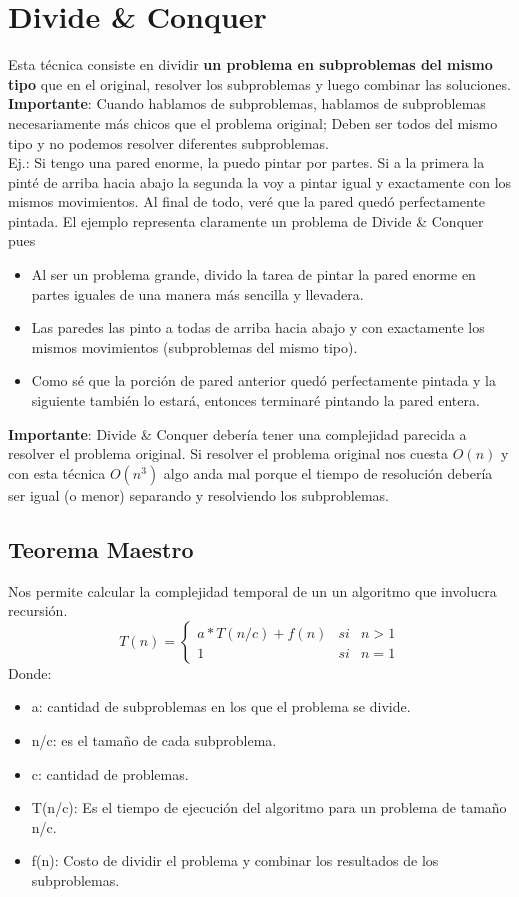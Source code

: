 \documentclass[10pt,a4paper]{article}
\begin{document}
\section*{Divide \& Conquer}
Esta técnica consiste en dividir \textbf{un problema en subproblemas
 del mismo tipo} que en el original, resolver los subproblemas y luego combinar las soluciones. \\

\textbf{Importante}: Cuando hablamos de subproblemas, hablamos de subproblemas necesariamente más chicos que el problema original; Deben ser todos del mismo tipo y no podemos resolver diferentes subproblemas. \\

Ej.: Si tengo una pared enorme, la puedo pintar por partes. Si a la primera la pinté de arriba hacia abajo la segunda la voy a pintar igual y exactamente con los mismos movimientos. Al final de todo, veré que la pared quedó perfectamente pintada.
El ejemplo representa claramente un problema de Divide \& Conquer pues
\begin{itemize}
    \item Al ser un problema grande, divido la tarea de pintar la pared enorme en partes iguales de una manera más sencilla y llevadera.
    \item Las paredes las pinto a todas de arriba hacia abajo y con exactamente los mismos movimientos (subproblemas del mismo tipo).
    \item Como sé que la porción de pared anterior quedó perfectamente pintada y la siguiente también lo estará, entonces terminaré pintando la pared entera.
\end{itemize}

\textbf{Importante}: Divide \& Conquer debería tener una complejidad parecida a resolver el problema original. Si resolver el problema original nos cuesta $O(n)$ y con esta técnica $O(n^{3})$ algo anda mal porque el tiempo de resolución debería ser igual (o menor) separando y resolviendo los subproblemas.
\subsection*{Teorema Maestro}
Nos permite calcular la complejidad temporal de un un algoritmo que involucra recursión.
\[T(n) = \left\{ \begin{array}{lcc} a \ast T(n/c) + f(n) & si & n>1  \\ 1 & si & n=1 \end{array} \right.\]
Donde: 
\begin{itemize}
    \item a: cantidad de subproblemas en los que el problema se divide.
    \item n/c: es el tamaño de cada subproblema.
    \item c: cantidad de problemas.
    \item T(n/c): Es el tiempo de ejecución del algoritmo para un problema de tamaño n/c.
    \item f(n): Costo de dividir el problema y combinar los resultados de los subproblemas.
\end{itemize}
\end{document}
